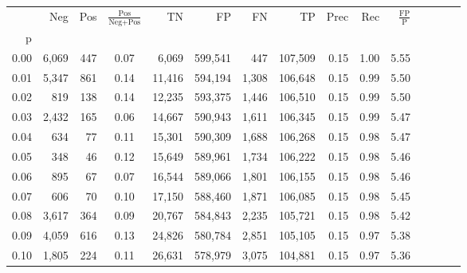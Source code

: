 \begin{tabular}{rrrcrrrrrrrrrrr}
\toprule
{} &     Neg &    Pos & $\frac{\text{Pos}}{\text{Neg}+\text{Pos}}$ &       TN &       FP &       FN &       TP &  Prec &   Rec & $\frac{\text{FP}}{\text{P}}$ \\
p    &         &        &                                            &          &          &          &          &       &       &                              \\
\midrule
0.00 &   6,069 &    447 &                                       0.07 &    6,069 &  599,541 &      447 &  107,509 &  0.15 &  1.00 &                         5.55 \\
0.01 &   5,347 &    861 &                                       0.14 &   11,416 &  594,194 &    1,308 &  106,648 &  0.15 &  0.99 &                         5.50 \\
0.02 &     819 &    138 &                                       0.14 &   12,235 &  593,375 &    1,446 &  106,510 &  0.15 &  0.99 &                         5.50 \\
0.03 &   2,432 &    165 &                                       0.06 &   14,667 &  590,943 &    1,611 &  106,345 &  0.15 &  0.99 &                         5.47 \\
0.04 &     634 &     77 &                                       0.11 &   15,301 &  590,309 &    1,688 &  106,268 &  0.15 &  0.98 &                         5.47 \\
0.05 &     348 &     46 &                                       0.12 &   15,649 &  589,961 &    1,734 &  106,222 &  0.15 &  0.98 &                         5.46 \\
0.06 &     895 &     67 &                                       0.07 &   16,544 &  589,066 &    1,801 &  106,155 &  0.15 &  0.98 &                         5.46 \\
0.07 &     606 &     70 &                                       0.10 &   17,150 &  588,460 &    1,871 &  106,085 &  0.15 &  0.98 &                         5.45 \\
0.08 &   3,617 &    364 &                                       0.09 &   20,767 &  584,843 &    2,235 &  105,721 &  0.15 &  0.98 &                         5.42 \\
0.09 &   4,059 &    616 &                                       0.13 &   24,826 &  580,784 &    2,851 &  105,105 &  0.15 &  0.97 &                         5.38 \\
0.10 &   1,805 &    224 &                                       0.11 &   26,631 &  578,979 &    3,075 &  104,881 &  0.15 &  0.97 &                         5.36 \\

\end{tabular}
